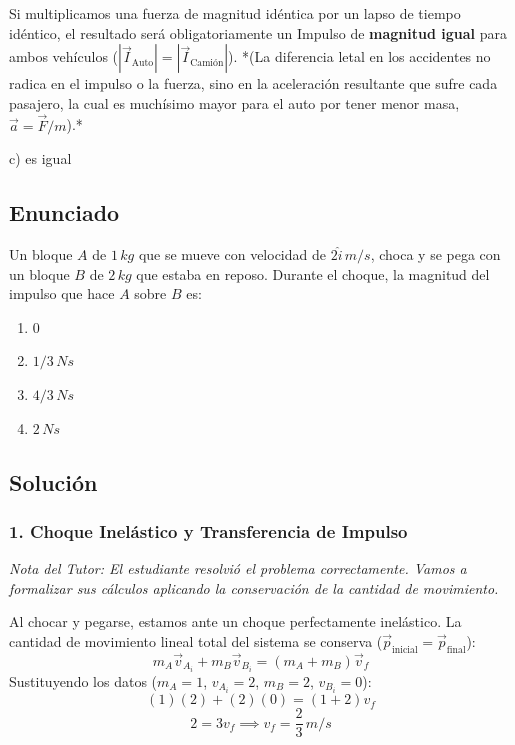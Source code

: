 \documentclass[12pt, a4paper]{article}
\begin{document}
Si multiplicamos una fuerza de magnitud idéntica por un lapso de tiempo idéntico, el resultado será obligatoriamente un Impulso de \textbf{magnitud igual} para ambos vehículos ($|\vec{I}_{\text{Auto}}| = |\vec{I}_{\text{Camión}}|$). 
*(La diferencia letal en los accidentes no radica en el impulso o la fuerza, sino en la aceleración resultante que sufre cada pasajero, la cual es muchísimo mayor para el auto por tener menor masa, $\vec{a} = \vec{F}/m$).*

\begin{tcolorbox}[colback=green!5!white, colframe=green!50!black, title=Respuesta Final]
\centering \Large c) es igual
\end{tcolorbox}

\newpage

\subsection*{Enunciado}
Un bloque $A$ de $1\,\si{kg}$ que se mueve con velocidad de $2\hat{i}\,\si{m/s}$, choca y se pega con un bloque $B$ de $2\,\si{kg}$ que estaba en reposo. Durante el choque, la magnitud del impulso que hace $A$ sobre $B$ es:
\begin{enumerate}[label=\alph*)]
    \item $0$
    \item $1/3\,\si{Ns}$
    \item $4/3\,\si{Ns}$
    \item $2\,\si{Ns}$
\end{enumerate}

\subsection*{Solución}

\subsubsection*{1. Choque Inelástico y Transferencia de Impulso}
\textit{Nota del Tutor: El estudiante resolvió el problema correctamente. Vamos a formalizar sus cálculos aplicando la conservación de la cantidad de movimiento.}

Al chocar y pegarse, estamos ante un choque perfectamente inelástico. La cantidad de movimiento lineal total del sistema se conserva ($\vec{p}_{\text{inicial}} = \vec{p}_{\text{final}}$):
$$ m_A \vec{v}_{A_i} + m_B \vec{v}_{B_i} = (m_A + m_B) \vec{v}_f $$
Sustituyendo los datos ($m_A = 1$, $v_{A_i} = 2$, $m_B = 2$, $v_{B_i} = 0$):
$$ (1)(2) + (2)(0) = (1 + 2) v_f $$
$$ 2 = 3 v_f \implies v_f = \frac{2}{3}\,\si{m/s} $$
\end{document}
